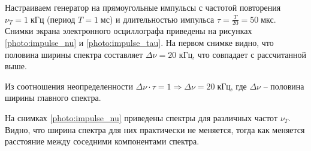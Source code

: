 Настраиваем генератор на прямоугольные импульсы с частотой повторения $\nu_T = 1 \; \text{кГц}$ (период $T = 1 \; \text{мс}$) и длительностью импульса $\tau = \frac{T}{20} = 50 \; \text{мкс}$. Снимки экрана электронного осциллографа приведены на рисунках \ref{photo:impulse_nu} и \ref{photo:impulse_tau}. На первом снимке видно, что половина ширины спектра составляет $\Delta \nu = 20$ кГц, что совпадает с рассчитанной выше.

Из соотношения неопределенности $ \Delta \nu \cdot \tau = 1 \Rightarrow \Delta \nu = 20 \; \text{кГц}$, где $\Delta \nu$ -- половина ширины главного спектра.

На снимках \ref{photo:impulse_nu} приведены спектры для различных частот $\nu_T$. Видно, что ширина спектра для них практически не меняется, тогда как меняется расстояние между соседними компонентами спектра.

